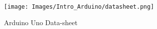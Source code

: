 \newpage
\begin{figure}
    \centering
    \texttt{[image: Images/Intro\_Arduino/datasheet.png]}
    \caption{Arduino Uno Data-sheet}
\end{figure}









